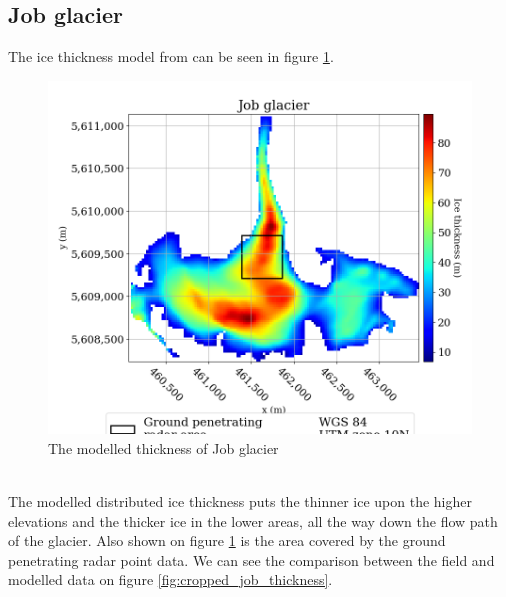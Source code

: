 \documentclass[a4, 12pt]{article}
\begin{document}
\subsection{Job glacier}
The ice thickness model from \citeauthor{farinotti2019consensus} \citeyear{farinotti2019consensus} can be seen in figure \ref{fig:job_thickness}.
\begin{figure}[h!]
\centering
\includegraphics[scale=0.45]{../job_kluane_maps/Job glacier_thickness.png}
\caption{The modelled thickness of Job glacier}
\label{fig:job_thickness}
\end{figure}
\\
The modelled distributed ice thickness puts the thinner ice upon the higher elevations and the thicker ice in the lower areas, all the way down the flow path of the glacier. Also shown on figure \ref{fig:job_thickness} is the area covered by the ground penetrating radar point data. We can see the comparison between the field and modelled data on figure \ref{fig:cropped_job_thickness}.
\end{document}
